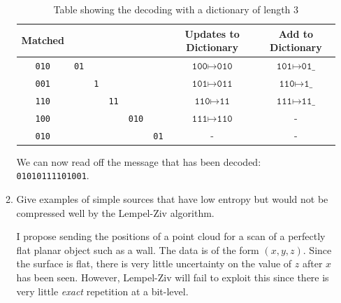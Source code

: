 \documentclass[10pt,\jkfside,a4paper]{article}
\begin{document}
\begin{enumerate}
\begin{enumerate}
        \begin{table}[H]

            \centering

            \begin{tabular}{cccccccc}


                \toprule

                Matched &&&&&& Updates to Dictionary & Add to Dictionary\\

                \midrule

                \texttt{010} & \texttt{01} &&&&& $\texttt{100} \mapsto \texttt{010}$ & $\texttt{101} \mapsto \texttt{01\_}$ \\

                \texttt{001} && \texttt{1} &&&& $\texttt{101} \mapsto \texttt{011}$ & $\texttt{110} \mapsto \texttt{1\_}$ \\

                \texttt{110} &&& \texttt{11} &&& $\texttt{110} \mapsto \texttt{11}$ & $\texttt{111} \mapsto \texttt{11\_}$ \\

                \texttt{100} &&&& \texttt{010} && $\texttt{111} \mapsto \texttt{110}$ & - \\

                \texttt{010} &&&&& \texttt{01} & - & - \\

                \bottomrule

            \end{tabular}

            \caption{Table showing the decoding with a dictionary of length 3}

        \end{table}

        We can now read off the message that has been decoded: \texttt{01010111101001}.

        \item Give examples of simple sources that have low entropy but would not be compressed well by the Lempel-Ziv algorithm.

        I propose sending the positions of a point cloud for a scan of a perfectly flat planar object such as a wall. The data is of the form $(x, y, z)$. Since the surface is flat, there is very little uncertainty on the value of $z$ after $x$ has been seen. However, Lempel-Ziv will fail to exploit this since there is very little \emph{exact} repetition at a bit-level.


\end{enumerate}
\end{enumerate}
\end{document}
